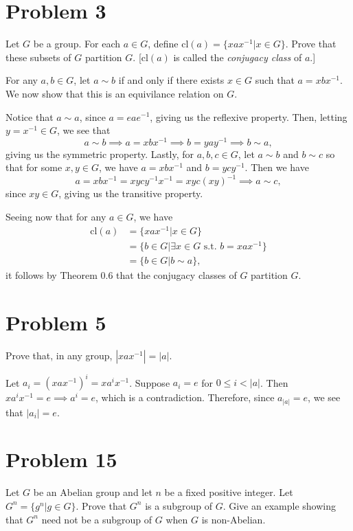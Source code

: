 \documentclass[12pt]{article}
\newcommand{\cl}{\mbox{cl}}
\begin{document}
\section*{Problem 3}

Let $G$ be a group.  For each $a\in G$, define $\cl(a)=\{xax^{-1}|x\in G\}$.
Prove that these subsets of $G$ partition $G$.  [$\cl(a)$ is called the {\it conjugacy
class} of $a$.]

For any $a,b\in G$, let $a\sim b$ if and only if there exists $x\in G$
such that $a=xbx^{-1}$.  We now show that this is an equivilance relation on $G$.

Notice that $a\sim a$, since $a=eae^{-1}$, giving us the reflexive property.
Then, letting $y=x^{-1}\in G$, we see that
\begin{equation*}
a\sim b\implies a=xbx^{-1}\implies b=yay^{-1}\implies b\sim a,
\end{equation*}
giving us the symmetric property.  Lastly, for $a,b,c\in G$,
let $a\sim b$ and $b\sim c$ so that for some $x,y\in G$, we have
$a=xbx^{-1}$ and $b=ycy^{-1}$.  Then we have
\begin{equation*}
a=xbx^{-1}=xycy^{-1}x^{-1}=xyc(xy)^{-1}\implies a\sim c,
\end{equation*}
since $xy\in G$, giving us the transitive property.

Seeing now that for any $a\in G$, we have
\begin{align*}
\cl(a)&=\{xax^{-1}|x\in G\}\\
 &= \{b\in G|\mbox{$\exists x\in G$ s.t. $b=xax^{-1}$}\}\\
 &= \{b\in G|b\sim a\},
\end{align*}
it follows by Theorem 0.6 that the conjugacy classes
of $G$ partition $G$.

\section*{Problem 5}

Prove that, in any group, $|xax^{-1}|=|a|$.

Let $a_i = (xax^{-1})^i=xa^ix^{-1}$.
Suppose $a_i=e$ for $0\leq i<|a|$.
Then $xa^ix^{-1}=e\implies a^i=e$, which is
a contradiction.  Therefore, since $a_{|a|}=e$,
we see that $|a_i|=e$.

\section*{Problem 15}

Let $G$ be an Abelian group and let $n$ be a fixed positive integer.  Let
$G^n=\{g^n|g\in G\}$.  Prove that $G^n$ is a subgroup of $G$.  Give an example
showing that $G^n$ need not be a subgroup of $G$ when $G$ is non-Abelian.
\end{document}
